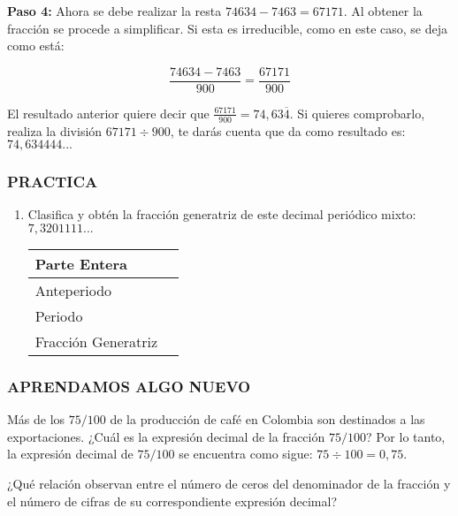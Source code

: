 \documentclass[12pt,a4paper]{article}
\begin{document}
\textbf{Paso 4:} Ahora se debe realizar la resta $74634 - 7463= 67171$. Al obtener la fracción se procede a simplificar. Si esta es irreducible, como en este caso, se deja como está:

$$\frac{74634 - 7463}{900} = \frac{67171}{900}$$

El resultado anterior quiere decir que $\frac{67171}{900} = 74,63\overline{4}$. Si quieres comprobarlo, realiza la división $67171\div 900$, te darás cuenta que da como resultado es: $74,634444...$

\vspace{1cm}

\subsubsection*{PRACTICA}

\begin{enumerate}
\item Clasifica y obtén la fracción generatriz de este decimal periódico mixto: $7,3201111...$

\vspace{0.5cm}

\begin{center}
\begin{tabular}{|l|l|}
\hline
Parte Entera & \\
\hline
Anteperiodo & \\
\hline
Periodo & \\
\hline
Fracción Generatriz & \\
\hline
\end{tabular}
\end{center}

\end{enumerate}

\vspace{1cm}

\subsubsection*{APRENDAMOS ALGO NUEVO}

Más de los $75 /100$ de la producción de café en Colombia son destinados a las exportaciones. ¿Cuál es la expresión decimal de la fracción $75 / 100$? Por lo tanto, la expresión decimal de $75/ 100$ se encuentra como sigue: $75 \div 100 = 0,75$.

¿Qué relación observan entre el número de ceros del denominador de la fracción y el número de cifras de su correspondiente expresión decimal?
\end{document}
